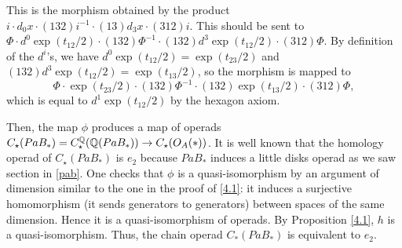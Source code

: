 \documentclass[TFM.tex]{subfiles}
\begin{document}

This is the morphism obtained by the product $i\cdot d_0x\cdot (132)i^{-1}\cdot (13)d_3x\cdot (312)i$. This should be sent to $\Phi\cdot d^0\exp(t_{12}/2)\cdot (132)\Phi^{-1}\cdot (132)d^3\exp(t_{12}/2)\cdot (312)\Phi$. By definition of the $d^i$'s, we have $d^0\exp(t_{12}/2)=\exp(t_{23}/2)$ and $(132)d^3\exp(t_{12}/2)=\exp(t_{13}/2)$, so the morphism is mapped to $$\Phi\cdot \exp(t_{23}/2)\cdot (132)\Phi^{-1}\cdot (132)\exp(t_{13}/2)\cdot (312)\Phi,$$ which is equal to $d^1\exp(t_{12}/2)$ by the hexagon axiom.

Then, the map $\phi$ produces a map of operads $C_\star(PaB_*)=C_\star^{\mathbb{Q}}(\mathbb{Q}(PaB_*))\to C_\star(O_A(*))$.
It is well known that the homology operad of $C_\star(PaB_*)$ is $e_2$ because $PaB_*$ induces a little disks operad as we saw section in \ref{pab}. One checks that $\phi$ is a quasi-isomorphism by an argument of dimension similar to the one in the proof of \ref{4.1}: it induces a surjective homomorphism (it sends generators to generators) between spaces of the same dimension. Hence it is a quasi-isomorphism of operads. By Proposition \ref{4.1}, $h$ is a quasi-isomorphism. Thus, the
chain operad $C_*(PaB_*)$ is equivalent to $e_2$.



\end{document}
